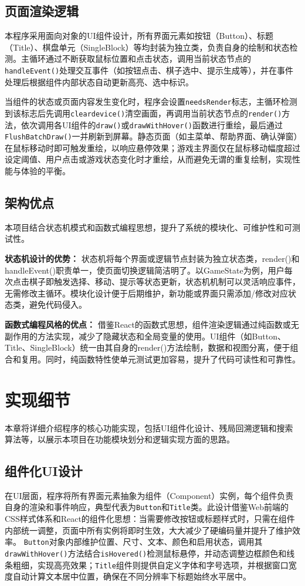 \documentclass[12pt, a4paper]{article}
\begin{document}
\subsection{页面渲染逻辑}
本程序采用面向对象的UI组件设计，所有界面元素如按钮（Button）、标题（Title）、棋盘单元（SingleBlock）等均封装为独立类，负责自身的绘制和状态检测。主循环通过不断获取鼠标位置和点击状态，调用当前状态节点的\texttt{handleEvent()}处理交互事件（如按钮点击、棋子选中、提示生成等），并在事件处理后根据组件内部状态自动更新高亮、选中标识。

当组件的状态或页面内容发生变化时，程序会设置\texttt{needsRender}标志，主循环检测到该标志后先调用\texttt{cleardevice()}清空画面，再调用当前状态节点的\texttt{render()}方法，依次调用各UI组件的\texttt{draw()}或\texttt{drawWithHover()}函数进行重绘，最后通过\texttt{FlushBatchDraw()}一并刷新到屏幕。静态页面（如主菜单、帮助界面、确认弹窗）在鼠标移动时即可触发重绘，以响应悬停效果；游戏主界面仅在鼠标移动幅度超过设定阈值、用户点击或游戏状态变化时才重绘，从而避免无谓的重复绘制，实现性能与体验的平衡。

\subsection{架构优点}
本项目结合状态机模式和函数式编程思想，提升了系统的模块化、可维护性和可测试性。

\textbf{状态机设计的优势：}
状态机将每个界面或逻辑节点封装为独立状态类，render()和handleEvent()职责单一，使页面切换逻辑简洁明了。以GameState为例，用户每次点击棋子即触发选择、移动、提示等状态更新，状态机机制可以灵活响应事件，无需修改主循环。模块化设计便于后期维护，新功能或界面只需添加/修改对应状态类，避免代码侵入。

\textbf{函数式编程风格的优点：}
借鉴React的函数式思想，组件渲染逻辑通过纯函数或无副作用的方法实现，减少了隐藏状态和全局变量的使用。UI组件（如Button、Title、SingleBlock）统一由其自身的render()方法绘制，数据和视图分离，便于组合和复用。同时，纯函数特性使单元测试更加容易，提升了代码可读性和可靠性。

\section{实现细节}
本章将详细介绍程序的核心功能实现，包括UI组件化设计、残局回溯逻辑和搜索算法等，以展示本项目在功能模块划分和逻辑实现方面的思路。

\subsection{组件化UI设计}
在UI层面，程序将所有界面元素抽象为组件（Component）实例，每个组件负责自身的渲染和事件响应，典型代表为\texttt{Button}和\texttt{Title}类。此设计借鉴Web前端的CSS样式体系和React的组件化思想：当需要修改按钮或标题样式时，只需在组件内部统一调整，页面中所有实例将即时生效，大大减少了硬编码量并提升了维护效率。
\texttt{Button}对象内部维护位置、尺寸、文本、颜色和启用状态，调用其\texttt{drawWithHover()}方法结合\texttt{isHovered()}检测鼠标悬停，并动态调整边框颜色和线条粗细，实现高亮效果；\texttt{Title}组件则提供自定义字体和字号选项，并根据窗口宽度自动计算文本居中位置，确保在不同分辨率下标题始终水平居中。
\end{document}
